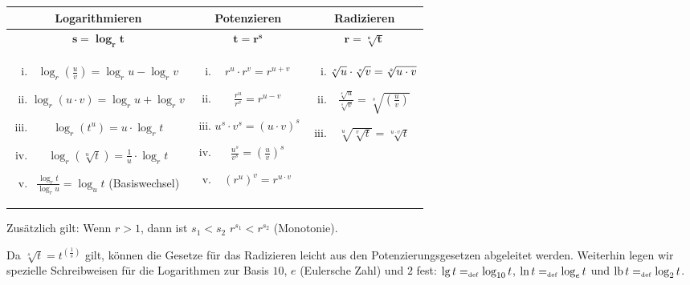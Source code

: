 \begin{center}
\begin{tabular}{c|c|c}
Logarithmieren & Potenzieren & Radizieren\\
\hline
$\mathbf{s = \log_r t}$ & $\mathbf{t = r^s}$ &
\phantom{$\left(\frac{\frac{c}{d}a}{b}\right)$} $\mathbf{r = \sqrt[\mathbf{s}]{\mathbf{t}}}$\\
\hline
\begin{minipage}[t]{0.38\textwidth}
\begin{enumerate}[i)]
%
\item $\log_r (\frac{u}{v}) = \log_r u - \log_r v$
%
\item $\log_r ({u} \cdot {v}) = \log_r u + \log_r v$
%
\item $\log_r (t^u) = u \cdot \log_r t$
%
\item $\log_r (\sqrt[u]{t}) = \frac{1}{u} \cdot \log_r t$
%
\item $\frac{\log_r t}{\log_r u} = \log_u t$ (Basiswechsel)
%
\end{enumerate}
\end{minipage}
&
\begin{minipage}[t]{0.25\textwidth}
\begin{enumerate}[i)]
%
\item $r^{u} \cdot r^{v} = r^{u + v}$
%
\item $\frac{r^{u}}{r^{v}} = r^{u - v}$
%
\item $u^{s} \cdot v^{s} = (u \cdot v)^{s}$
%
\item $\frac{u^{s}}{v^{s}} = \left(\frac{u}{v}\right)^{s}$
%
\item $(r^{u})^{v} = r^{u \cdot v}$ 
%
\end{enumerate}
\end{minipage}
&
\begin{minipage}[t]{0.28\textwidth}
%
\begin{enumerate}[i)]
%
\item $\sqrt[\leftroot{1} s]{u} \cdot \sqrt[s]{v} = \sqrt[s]{u \cdot v}$
%
\item $\frac{\sqrt[s]{u}}{\sqrt[s]{v}} = \sqrt[s]{\left(\frac{u}{v}\right)}$
%
\item $\sqrt[u]{\sqrt[v]{t}} =
  \sqrt[u \cdot v]{t}$
%
\end{enumerate}
\end{minipage}\\
\end{tabular}
\end{center}
Zusätzlich gilt: Wenn $r > 1$, dann ist $s_1 < s_2$ \gdw $r^{s_1} <
r^{s_2}$ (Monotonie).

Da $\sqrt[s]{t} = t^{\left(\frac{1}{s}\right)}$ gilt, können die Gesetze für das Radizieren leicht aus den Potenzierungsgesetzen abgeleitet werden.  Weiterhin legen wir spezielle Schreibweisen für die Logarithmen zur Basis $10$, $e$ (Eulersche Zahl) und $2$ fest: $\lg t =_{\mathrm{\scriptscriptstyle def}} \log_{10} t$, $\ln t =_{\mathrm{\scriptscriptstyle def}} \log_{e} t$ und $\mathrm{lb}\, t =_{\mathrm{\scriptscriptstyle def}} \log_{2} t$.
